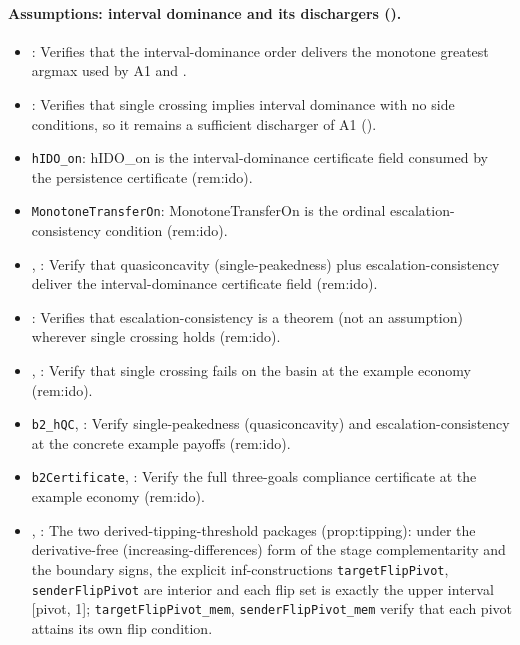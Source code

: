 \paragraph{Assumptions: interval dominance and its dischargers ().}
\begin{itemize}[leftmargin=1.4em,itemsep=1pt]
\item {}: Verifies that the interval-dominance order delivers the monotone greatest argmax used by A1 and .
\item {}: Verifies that single crossing implies interval dominance with no side conditions, so it remains a sufficient discharger of A1 ().
\item \texttt{hIDO\_on}: hIDO\_on is the interval-dominance certificate field consumed by the persistence certificate (rem:ido).
\item \texttt{MonotoneTransferOn}: MonotoneTransferOn is the ordinal escalation-consistency condition (rem:ido).
\item {}, : Verify that quasiconcavity (single-peakedness) plus escalation-consistency deliver the interval-dominance certificate field (rem:ido).
\item {}: Verifies that escalation-consistency is a theorem (not an assumption) wherever single crossing holds (rem:ido).
\item {}, : Verify that single crossing fails on the basin at the example economy (rem:ido).
\item \texttt{b2\_hQC}, : Verify single-peakedness (quasiconcavity) and escalation-consistency at the concrete example payoffs (rem:ido).
\item \texttt{b2Certificate}, : Verify the full three-goals compliance certificate at the example economy (rem:ido).
\item {}, : The two derived-tipping-threshold packages (prop:tipping): under the derivative-free (increasing-differences) form of the stage complementarity and the boundary signs, the explicit inf-constructions \texttt{targetFlipPivot}, \texttt{senderFlipPivot} are interior and each flip set is exactly the upper interval [pivot, 1]; \texttt{targetFlipPivot\_mem}, \texttt{senderFlipPivot\_mem} verify that each pivot attains its own flip condition.

\end{itemize}
